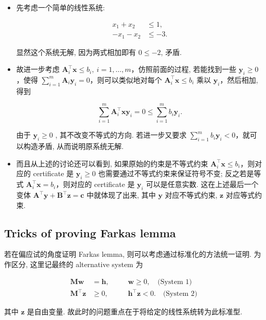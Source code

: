 \begin{itemize}
\item {}先考虑一个简单的线性系统:

\[
\begin{aligned}
  x_1 + x_2 &\leq 1,\\
  -x_1 - x_2 &\leq -3.
\end{aligned}
\]

显然这个系统无解, 因为两式相加即有 $0 \leq -2$, 矛盾.


\item {}故进一步考虑 $\bm{A}_i^\top \bm{x} \leq b_i,~ i=1,\dots,m$，仿照前面的过程, 若能找到一些 $\bm{y}_i \geq 0$，使得 $\sum_{i=1}^m \bm{A}_i \bm{y}_i = 0$，则可以类似地对每个 $\bm{A}_i^\top \bm{x} \leq b_i$ 乘以 $\bm{y}_i$，然后相加, 得到

\[
\sum_{i=1}^m \bm{A}_i^\top \bm{x} \bm{y}_i = 0 \leq \sum_{i=1}^m b_i \bm{y}_i.
\]

由于 $\bm{y}_i \geq 0$ , 其不改变不等式的方向. 若进一步又要求 $\sum_{i=1}^m b_i \bm{y}_i < 0$，就可以构造矛盾, 从而说明原系统无解.


\item {}而且从上述的讨论还可以看到, 如果原始的约束是不等式约束 $\bm{A}_i^\top \bm{x} \leq b_i$，则对应的 certificate 是 $\bm{y}_i \geq 0$ 也需要通过不等式约束来保证符号不变; 反之若是等式 $\bm{A}_i^\top \bm{x} = b_i$，则对应的 certificate 是 $\bm{y}_i$ 可以是任意实数. 这在上述最后一个变体 $\bm{A}^\top \bm{y} + \bm{B}^\top \bm{z} = \bm{c}$ 中就体现了出来, 其中 $\bm{y}$ 对应不等式约束, $\bm{z}$ 对应等式约束.


\end{itemize}

\subsection{Tricks of proving Farkas lemma}

若在偏应试的角度证明 Farkas lemma, 则可以考虑通过标准化的方法统一证明. 为作区分, 这里记最终的 alternative system 为

\[
\begin{aligned}
  \bm{M}\bm{w} & = \bm{h},\quad &&\bm{w} \geq 0,\quad \text{(System 1)}\\
  \bm{M}^\top \bm{z} &\geq 0,\quad &&\bm{h}^\top \bm{z} < 0. \quad \text{(System 2)}
\end{aligned}
\]

其中 $\bm{z}$ 是自由变量. 故此时的问题重点在于将给定的线性系统转为此标准型.


